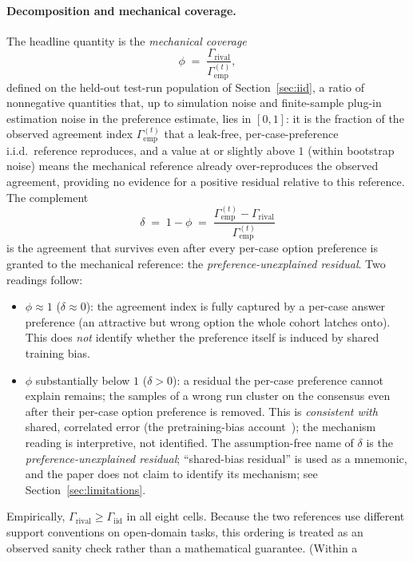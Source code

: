 \documentclass[a4paper,fleqn]{cas-sc}
\newcommand{\agreementIndex}{\Gamma}
\begin{document}
\paragraph{Decomposition and mechanical coverage.}
The headline quantity is the \emph{mechanical coverage}
\[
\phi \;=\; \frac{\agreementIndex_{\mathrm{rival}}}{\agreementIndex_{\mathrm{emp}}^{(t)}},
\]
defined on the held-out test-run population of Section~\ref{sec:iid},
a ratio of nonnegative quantities that, up to simulation noise and
finite-sample plug-in estimation noise in the preference estimate, lies in
$[0,1]$: it is the fraction of the observed agreement index
$\agreementIndex_{\mathrm{emp}}^{(t)}$ that a
leak-free, per-case-preference i.i.d.\ reference reproduces, and a value
at or slightly above $1$ (within bootstrap noise) means the mechanical
reference already over-reproduces the observed agreement, providing no
evidence for a positive residual relative to this reference. The complement
\[
\delta \;=\; 1-\phi \;=\; \frac{\agreementIndex_{\mathrm{emp}}^{(t)}-\agreementIndex_{\mathrm{rival}}}{\agreementIndex_{\mathrm{emp}}^{(t)}}
\]
is the agreement that survives even after every per-case option
preference is granted to the mechanical reference: the \emph{preference-unexplained
residual}. Two readings follow:
\begin{itemize}
\item $\phi\approx1$ ($\delta\approx0$): the agreement index is
  fully captured by a per-case answer preference (an attractive but wrong
  option the whole cohort latches onto). This does \emph{not} identify
  whether the preference itself is induced by shared training bias.
\item $\phi$ substantially below $1$ ($\delta>0$): a residual the
  per-case preference cannot explain remains; the samples of a wrong run cluster
  on the consensus even after their per-case option preference is
  removed. This is \emph{consistent with}
  shared, correlated error (the pretraining-bias
  account~\cite{mccoy2024}); the mechanism reading is interpretive, not identified. The assumption-free name of
  $\delta$ is the \emph{preference-unexplained residual}; ``shared-bias residual'' is used as a mnemonic, and
the paper does not claim to identify its mechanism; see
  Section~\ref{sec:limitations}.
\end{itemize}
Empirically, $\agreementIndex_{\mathrm{rival}}\ge\agreementIndex_{\mathrm{iid}}$ in all
eight cells. Because the two references use different support
conventions on open-domain tasks, this ordering is treated as an
observed sanity check rather than a mathematical guarantee. (Within a
\end{document}
